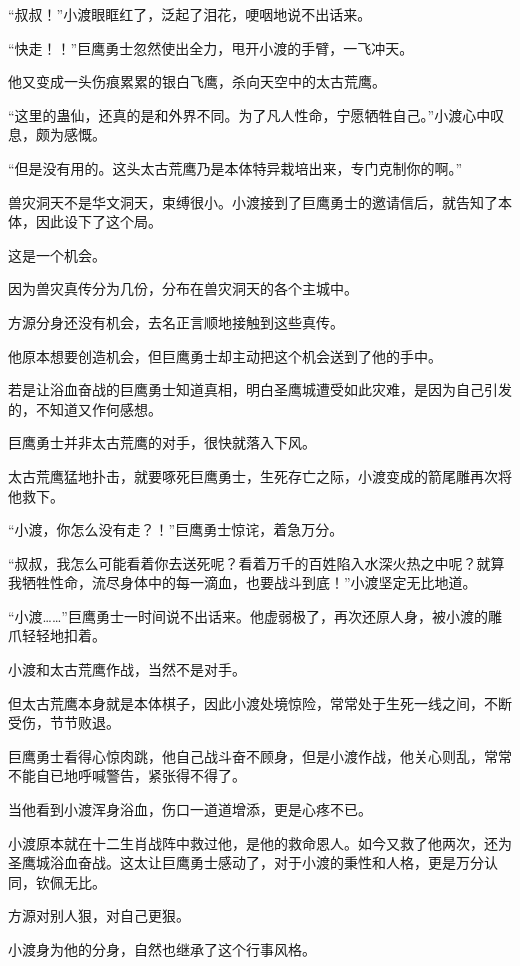 \begin{this_body}
“叔叔！”小渡眼眶红了，泛起了泪花，哽咽地说不出话来。

“快走！！”巨鹰勇士忽然使出全力，甩开小渡的手臂，一飞冲天。

他又变成一头伤痕累累的银白飞鹰，杀向天空中的太古荒鹰。

“这里的蛊仙，还真的是和外界不同。为了凡人性命，宁愿牺牲自己。”小渡心中叹息，颇为感慨。

“但是没有用的。这头太古荒鹰乃是本体特异栽培出来，专门克制你的啊。”

兽灾洞天不是华文洞天，束缚很小。小渡接到了巨鹰勇士的邀请信后，就告知了本体，因此设下了这个局。

这是一个机会。

因为兽灾真传分为几份，分布在兽灾洞天的各个主城中。

方源分身还没有机会，去名正言顺地接触到这些真传。

他原本想要创造机会，但巨鹰勇士却主动把这个机会送到了他的手中。

若是让浴血奋战的巨鹰勇士知道真相，明白圣鹰城遭受如此灾难，是因为自己引发的，不知道又作何感想。

巨鹰勇士并非太古荒鹰的对手，很快就落入下风。

太古荒鹰猛地扑击，就要啄死巨鹰勇士，生死存亡之际，小渡变成的箭尾雕再次将他救下。

“小渡，你怎么没有走？！”巨鹰勇士惊诧，着急万分。

“叔叔，我怎么可能看着你去送死呢？看着万千的百姓陷入水深火热之中呢？就算我牺牲性命，流尽身体中的每一滴血，也要战斗到底！”小渡坚定无比地道。

“小渡……”巨鹰勇士一时间说不出话来。他虚弱极了，再次还原人身，被小渡的雕爪轻轻地扣着。

小渡和太古荒鹰作战，当然不是对手。

但太古荒鹰本身就是本体棋子，因此小渡处境惊险，常常处于生死一线之间，不断受伤，节节败退。

巨鹰勇士看得心惊肉跳，他自己战斗奋不顾身，但是小渡作战，他关心则乱，常常不能自已地呼喊警告，紧张得不得了。

当他看到小渡浑身浴血，伤口一道道增添，更是心疼不已。

小渡原本就在十二生肖战阵中救过他，是他的救命恩人。如今又救了他两次，还为圣鹰城浴血奋战。这太让巨鹰勇士感动了，对于小渡的秉性和人格，更是万分认同，钦佩无比。

方源对别人狠，对自己更狠。

小渡身为他的分身，自然也继承了这个行事风格。


\end{this_body}
